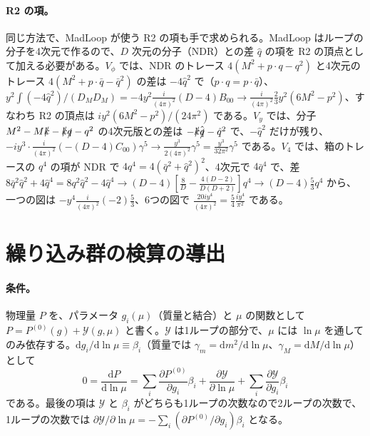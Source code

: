 \documentclass[a4paper,10pt]{ltjsarticle}
\newcommand{\dd}{\mathrm{d}}
\begin{document}
\paragraph{R2 の項。}同じ方法で、MadLoop が使う R2 の項も手で求められる。MadLoop はループの分子を4次元で作るので、$D$ 次元の分子（NDR）との差 $\hat q$ の項を R2 の頂点として加える必要がある。$V_\phi$ では、NDR のトレース $4(M^2+p\cdot q-q^2)$ と4次元のトレース $4(M^2+p\cdot\bar q-\bar q^2)$ の差は $-4\hat q^2$ で（$p\cdot q=p\cdot\bar q$）、$y^2\int(-4\hat q^2)/(D_MD_M)=-4y^2\frac{i}{(4\pi)^2}(D-4)B_{00}\to\frac{i}{(4\pi)^2}\frac23y^2(6M^2-p^2)$、すなわち R2 の頂点は $iy^2(6M^2-p^2)/(24\pi^2)$ である。$V_y$ では、分子 $M^2-M\slashed k-\slashed k\slashed q-q^2$ の4次元版との差は $-\slashed k\hat{\slashed q}-\hat q^2$ で、$-\hat q^2$ だけが残り、$-iy^3\cdot\frac{i}{(4\pi)^2}(-(D-4)C_{00})\gamma^5\to\frac{y^3}{2(4\pi)^2}\gamma^5=\frac{y^3}{32\pi^2}\gamma^5$ である。$V_4$ では、箱のトレースの $q^4$ の項が NDR で $4q^4=4(\bar q^2+\hat q^2)^2$、4次元で $4\bar q^4$ で、差 $8\bar q^2\hat q^2+4\hat q^4=8q^2\hat q^2-4\hat q^4\to(D-4)[\frac8D-\frac{4(D-2)}{D(D+2)}]q^4\to(D-4)\frac53q^4$ から、一つの図は $-y^4\frac{i}{(4\pi)^2}(-2)\frac53$、6つの図で $\frac{20iy^4}{(4\pi)^2}=\frac54\frac{iy^4}{\pi^2}$ である。

\section{繰り込み群の検算の導出}\label{app:rgfit}

\paragraph{条件。}物理量 $P$ を、パラメータ $g_i(\mu)$（質量と結合）と $\mu$ の関数として $P=P^{(0)}(g)+\mathcal Y(g,\mu)$ と書く。$\mathcal Y$ は1ループの部分で、$\mu$ には $\ln\mu$ を通してのみ依存する。$\dd g_i/\dd\ln\mu\equiv\beta_i$（質量では $\gamma_m=\dd m^2/\dd\ln\mu$、$\gamma_M=\dd M/\dd\ln\mu$）として
\begin{equation*}
0=\frac{\dd P}{\dd\ln\mu}=\sum_i\frac{\partial P^{(0)}}{\partial g_i}\beta_i+\frac{\partial\mathcal Y}{\partial\ln\mu}+\sum_i\frac{\partial\mathcal Y}{\partial g_i}\beta_i
\end{equation*}
である。最後の項は $\mathcal Y$ と $\beta_i$ がどちらも1ループの次数なので2ループの次数で、1ループの次数では $\partial\mathcal Y/\partial\ln\mu=-\sum_i(\partial P^{(0)}/\partial g_i)\beta_i$ となる。
\end{document}
